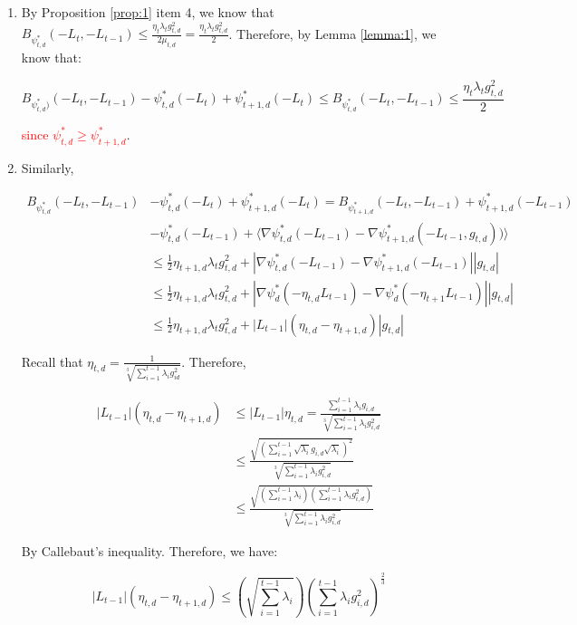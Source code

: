 \documentclass{article}
\newcommand{\todo}[1]{\textcolor{red}{#1}}
\begin{document}
\begin{enumerate}
  \item By Proposition \ref{prop:1} item 4, we know that $B_{\psi_{t,d}^*}(-L_t, -L_{t-1}) \leq \frac{\eta_t \lambda_t
    g_{t,d}^2}{2 \mu_{t,d}} = \frac{\eta_t \lambda_t g_{t,d}^2}{2}$. Therefore, by Lemma \ref{lemma:1}, we know that:

    \[
      B_{\psi_{t,d}^*)}(-L_t, -L_{t-1}) - \psi_{t,d}^*(-L_t) + \psi_{t+1,d}^*(-L_t) \leq B_{\psi_{t,d}^*}(-L_t,
      -L_{t-1}) \leq \frac{\eta_t \lambda_t g_{t,d}^2}{2}
    \]

    \todo{since $\psi_{t,d}^* \geq \psi_{t+1,d}^*$}.
  \item Similarly,

    \begin{align*}
      B_{\psi_{t,d}^*}(-L_t, -L_{t-1}) 
      &- \psi_{t,d}^*(-L_t) + \psi_{t+1,d}^*(-L_t) = B_{\psi_{t+1,d}^*}(-L_t, -L_{t-1}) + \psi_{t+1,d}^*(-L_{t-1}) \\
      & - \psi_{t,d}^*(-L_{t-1}) + \langle \nabla \psi_{t,d}^*(-L_{t-1}) - \nabla \psi_{t+1,d}^*(-L_{t-1},
      g_{t,d}))\rangle \\
      &\leq \frac{1}{2} \eta_{t+1,d}\lambda_t g_{t,d}^2 + | \nabla \psi_{t,d}^*(-L_{t-1}) - \nabla
      \psi_{t+1,d}^*(-L_{t-1})| |g_{t,d}| \\
      &\leq \frac{1}{2} \eta_{t+1,d}\lambda_t g_{t,d}^2 + | \nabla \psi_{d}^*(-\eta_{t,d} L_{t-1}) - \nabla
      \psi_{d}^*(-\eta_{t+1}L_{t-1})| |g_{t,d}| \\
      &\leq \frac{1}{2} \eta_{t+1,d}\lambda_t g_{t,d}^2 + |L_{t-1}|(\eta_{t,d} - \eta_{t+1,d})|g_{t,d}|
    \end{align*}

    Recall that $\eta_{t,d} = \frac{1}{\sqrt[3]{\sum\limits_{i=1}^{t-1} \lambda_i g_{id}^2}}$. Therefore,

    \begin{align*}
      |L_{t-1}|(\eta_{t,d} - \eta_{t+1,d}) 
      &\leq |L_{t-1}|\eta_{t,d} = \frac{\sum_{i=1}^{t-1} \lambda_i g_{i,d}}{\sqrt[3]{\sum_{i=1}^{t-1}\lambda_i
      g_{i,d}^2}} \\
      &\leq \frac{\sqrt{(\sum_{i=1}^{t-1} \sqrt{\lambda_i} g_{i,d}
      \sqrt{\lambda_i})^2}}{\sqrt[3]{\sum_{i=1}^{t-1} \lambda_i g_{i,d}^2}} \\
      &\leq \frac{\sqrt{(\sum_{i=1}^{t-1} \lambda_i)(\sum_{i=1}^{t-1}\lambda_i g_{i,d}^2)}}{\sqrt[3]{\sum_{i=1}^{t-1} \lambda_i g_{i,d}^2}}
    \end{align*}

    By Callebaut's inequality. Therefore, we have:

    \[
      |L_{t-1}|(\eta_{t,d} - \eta_{t+1,d}) \leq \left(\sqrt{\sum_{i=1}^{t-1} \lambda_i}\right)\left(\sum_{i=1}^{t-1}\lambda_i
      g_{i,d}^2\right)^\frac{2}{3}
    \]
\end{enumerate}
\end{document}
